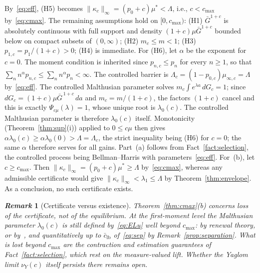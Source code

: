 \documentclass[letterpaper, 10pt, conference]{ieeeconf}
\makeatletter
\newtheorem{remark}{\it \textbf{Remark}}
\newcommand{\Lbar}{\Lambda}
\newcommand{\rev}[1]{#1}
\newcommand{\pl}[1]{#1}
\renewenvironment{proof}[1][\proofname]{\par
  \pushQED{\qed}%
  \normalfont\topsep6\p@\@plus6\p@\relax
  \trivlist
  \item[\hskip\labelsep\itshape #1\@addpunct{.}]\ignorespaces
}{%
  \popQED\endtrivlist\@endpefalse
}
\renewenvironment{proof}[1][\proofname]{\par
  \pushQED{\qed}%
  \normalfont\topsep6\p@\@plus6\p@\relax
  \trivlist
  \item[\hskip\labelsep\itshape #1\@addpunct{.}]\ignorespaces
}{%
  \popQED\endtrivlist\@endpefalse
}
\makeatother
\begin{document}
\begin{proof}
By~\eqref{eq:eff}, (H5) becomes
$\|\kappa_c\|_\infty=(p_0+c)\mu^\ast<\Lbar$, i.e.,
$c<c_{\max}$ by~\eqref{eq:cmax}. The remaining assumptions hold on
$[0,c_{\max})$:
(H1) $\bar G^{1+c}$ is absolutely continuous with full support and density
$(1+c)\mu\bar G^{1+c}$ bounded below on compact subsets of $(0,\infty)$;
(H2) $m_c\le m<1$;
(H3) $p_{1,c}=p_1/(1+c)>0$;
(H4) is immediate.
\rev{For (H6), let $\alpha$ be the exponent for $c=0$. The moment condition
is inherited since $p_{n,c}\le p_n$ for every $n\ge1$, so that
$\sum_nn^\alpha p_{n,c}\le\sum_nn^\alpha p_n<\infty$. The controlled barrier is
$\Lbar_c=(1-p_{0,c})\mu_{\infty,c}=\Lbar$ by~\eqref{eq:eff}. The controlled
Malthusian parameter solves $m_c\int e^{\lambda a}\,dG_c=1$; since
$dG_c=(1+c)\mu\bar G^{\,1+c}\,da$ and $m_c=m/(1+c)$, the factors $(1+c)$ cancel
and this is exactly $\Psi_{c\mu}(\lambda)=1$, whose unique root is
$\lambda_0(c)$. \pl{The controlled Malthusian parameter is therefore $\lambda_0(c)$ itself.} Monotonicity
(Theorem~\ref{thm:sup}(i)) applied to $0\le c\mu$ then gives
$\alpha\lambda_0(c)\ge\alpha\lambda_0(0)>\Lbar=\Lbar_c$, the strict inequality
being (H6) for $c=0$; the same $\alpha$ therefore serves for all gains.}
\rev{Part~(a) follows from Fact~\ref{fact:selection}, the controlled process
being Bellman--Harris with parameters~\eqref{eq:eff}. For~(b), let $c\ge c_{\max}$.
Then $\|\kappa_c\|_\infty=(p_0+c)\mu^\ast\ge\Lbar$ by~\eqref{eq:cmax}, whereas
any admissible certificate would give $\|\kappa_c\|_\infty<\lambda_1\le\Lbar$ by
Theorem~\ref{thm:envelope}. As a conclusion, no such certificate exists.}
\end{proof}

\begin{remark}[Certificate versus existence]
\label{rem:cert}
Theorem~\ref{thm:cmax}(b) concerns loss of the certificate, not of the
equilibrium. \rev{At the first-moment level the Malthusian parameter
$\lambda_0(c)$ is still defined by~\eqref{eq:ELu} well beyond $c_{\max}$: by
renewal theory, or by~\cite[Thm.~3.8]{bansaye2020}, and quantitatively up to
$\bar c_{\mathrm{lb}}$ of~\eqref{eq:sep} by Remark~\ref{prop:separation}. What
is lost beyond $c_{\max}$ are the contraction and estimation guarantees of
Fact~\ref{fact:selection}, which rest on the measure-valued lift. Whether the
Yaglom limit $\nu_Y(c)$ itself persists there remains open.}
\end{remark}
\end{document}
